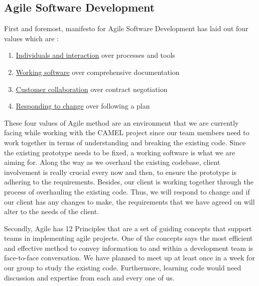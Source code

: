 \documentclass[12pt]{article}
\begin{document}
		\subsection{Agile Software Development}
			First and foremost, manifesto for Agile Software Development has laid out four values which are \cite{agileArtOfDevelopment}:
			
			\begin{enumerate}[i]
				\item \underline{Individuals and interaction} over processes and tools
				\item \underline{Working software} over comprehensive documentation
				\item \underline{Customer collaboration} over contract negotiation
				\item \underline{Responding to change} over following a plan
			\end{enumerate}
			
			These four values of Agile method are an environment that we are currently facing while working with the CAMEL project since our team members need to work together in terms of understanding and breaking the existing code. Since the existing prototype needs to be fixed, a working software is what we are aiming for. Along the way as we overhaul the existing codebase, client involvement is really crucial every now and then, to ensure the prototype is adhering to the requirements. Besides, our client is working together through the process of overhauling the existing code. Thus, we will respond to change and if our client has any changes to make, the requirements that we have agreed on will alter to the needs of the client.  
			
			Secondly, Agile has 12 Principles \cite{agileProjectManagementForDummies} that are a set of guiding concepts that support teams in implementing agile projects. One of the concepts says the most efficient and effective method to convey information to and within a development team is face-to-face conversation. We have planned to meet up at least once in a week for our group to study the existing code. Furthermore, learning code would need discussion and expertise from each and every one of us.
			
	\newpage
	
\end{document}
